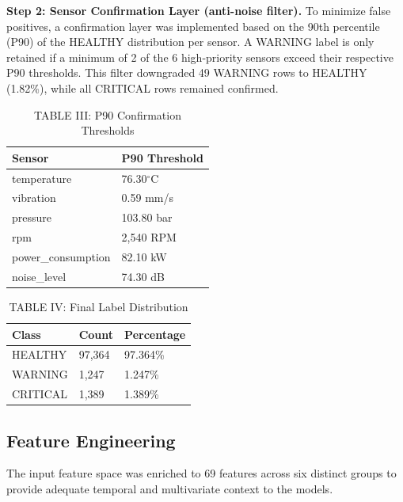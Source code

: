 \documentclass[conference]{IEEEtran}
\begin{document}
\textbf{Step 2: Sensor Confirmation Layer (anti-noise filter).}
To minimize false positives, a confirmation layer was implemented based on the 90th percentile (P90) of the HEALTHY distribution per sensor. A WARNING label is only retained if a minimum of 2 of the 6 high-priority sensors exceed their respective P90 thresholds. This filter downgraded 49 WARNING rows to HEALTHY (1.82\%), while all CRITICAL rows remained confirmed.

\begin{table}[htbp]
\caption{TABLE III: P90 Confirmation Thresholds}
\centering
\begin{tabular}{ll}
\hline
\textbf{Sensor} & \textbf{P90 Threshold} \\
\hline
temperature & 76.30$^\circ$C \\
vibration & 0.59 mm/s \\
pressure & 103.80 bar \\
rpm & 2,540 RPM \\
power\_consumption & 82.10 kW \\
noise\_level & 74.30 dB \\
\hline
\end{tabular}
\label{tab:p90_thresholds}
\end{table}

\begin{table}[htbp]
\caption{TABLE IV: Final Label Distribution}
\centering
\begin{tabular}{lll}
\hline
\textbf{Class} & \textbf{Count} & \textbf{Percentage} \\
\hline
HEALTHY & 97,364 & 97.364\% \\
WARNING & 1,247 & 1.247\% \\
CRITICAL & 1,389 & 1.389\% \\
\hline
\end{tabular}
\label{tab:final_label_dist}
\end{table}

\subsection{Feature Engineering}
The input feature space was enriched to 69 features across six distinct groups to provide adequate temporal and multivariate context to the models.
\end{document}
